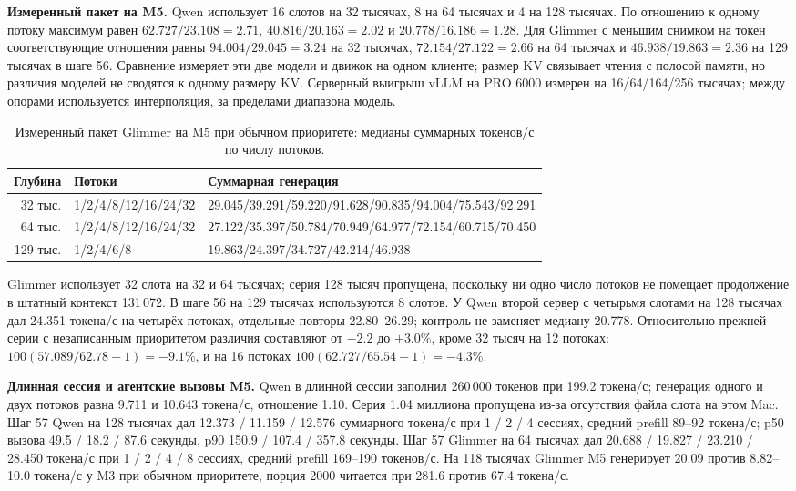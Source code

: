 \textbf{Измеренный пакет на M5.} Qwen использует 16 слотов на 32 тысячах,
8 на 64 тысячах и 4 на 128 тысячах. По отношению к одному потоку
максимум равен $62.727/23.108=2.71$, $40.816/20.163=2.02$ и $20.778/16.186=1.28$.
Для Glimmer с меньшим снимком на токен соответствующие отношения равны
$94.004/29.045=3.24$ на 32 тысячах, $72.154/27.122=2.66$ на 64 тысячах
и $46.938/19.863=2.36$ на 129 тысячах в шаге 56.
Сравнение измеряет эти две модели и движок на одном клиенте; размер KV связывает чтения с полосой памяти,
но различия моделей не сводятся к одному размеру KV. Серверный выигрыш vLLM на PRO 6000 измерен на 16/64/164/256 тысячах; между опорами используется интерполяция, за пределами диапазона модель.

\begin{table}[t]
\centering
\caption{Измеренный пакет Glimmer на M5 при обычном приоритете: медианы суммарных токенов/с по числу потоков.}
\label{tab:m5-glimmer-parallel}
\footnotesize
\begin{tabular}{rll}
\toprule
Глубина & Потоки & Суммарная генерация \\
\midrule
32 тыс. & 1/2/4/8/12/16/24/32 & 29.045/39.291/59.220/91.628/90.835/94.004/75.543/92.291 \\
64 тыс. & 1/2/4/8/12/16/24/32 & 27.122/35.397/50.784/70.949/64.977/72.154/60.715/70.450 \\
129 тыс. & 1/2/4/6/8 & 19.863/24.397/34.727/42.214/46.938 \\
\bottomrule
\end{tabular}
\end{table}

Glimmer использует 32 слота на 32 и 64 тысячах; серия 128 тысяч пропущена,
поскольку ни одно число потоков не помещает продолжение в штатный контекст 131\,072.
В шаге 56 на 129 тысячах используются 8 слотов. У Qwen второй сервер с четырьмя слотами на 128 тысячах
дал 24.351 токена/с на четырёх потоках, отдельные повторы 22.80--26.29;
контроль не заменяет медиану 20.778. Относительно прежней серии с незаписанным приоритетом
различия составляют от $-2.2$ до $+3.0$\%, кроме 32 тысяч на 12 потоках:
$100(57.089/62.78-1)=-9.1$\%, и на 16 потоках $100(62.727/65.54-1)=-4.3$\%.

\textbf{Длинная сессия и агентские вызовы M5.} Qwen в длинной сессии заполнил 260\,000 токенов при 199.2 токена/с;
генерация одного и двух потоков равна 9.711 и 10.643 токена/с, отношение 1.10.
Серия 1.04 миллиона пропущена из-за отсутствия файла слота на этом Mac.
Шаг 57 Qwen на 128 тысячах дал 12.373 / 11.159 / 12.576 суммарного токена/с
при 1 / 2 / 4 сессиях, средний prefill 89--92 токена/с;
p50 вызова 49.5 / 18.2 / 87.6 секунды, p90 150.9 / 107.4 / 357.8 секунды.
Шаг 57 Glimmer на 64 тысячах дал 20.688 / 19.827 / 23.210 / 28.450 токена/с
при 1 / 2 / 4 / 8 сессиях, средний prefill 169--190 токенов/с.
На 118 тысячах Glimmer M5 генерирует 20.09 против 8.82--10.0 токена/с у M3 при обычном приоритете,
порция 2000 читается при 281.6 против 67.4 токена/с.

